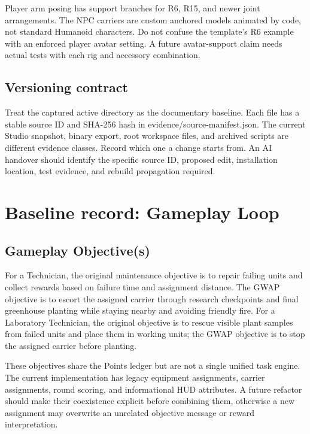 Player arm posing has support branches for R6, R15, and newer joint arrangements.\allowbreak{} The NPC carriers are custom anchored models animated by code, not standard Humanoid characters.\allowbreak{} Do not confuse the template's R6 example with an enforced player avatar setting.\allowbreak{} A future avatar-support claim needs actual tests with each rig and accessory combination.\allowbreak{}

\section{Versioning contract}
Treat the captured active directory as the documentary baseline.\allowbreak{} Each file has a stable source ID and SHA-256 hash in evidence/\allowbreak{}source-manifest.\allowbreak{}json.\allowbreak{} The current Studio snapshot, binary export, root workspace files, and archived scripts are different evidence classes.\allowbreak{} Record which one a change starts from.\allowbreak{} An AI handover should identify the specific source ID, proposed edit, installation location, test evidence, and rebuild propagation required.\allowbreak{}

\chapter{Baseline record: Gameplay Loop}
\section{Gameplay Objective(s)}
For a Technician, the original maintenance objective is to repair failing units and collect rewards based on failure time and assignment distance.\allowbreak{} The GWAP objective is to escort the assigned carrier through research checkpoints and final greenhouse planting while staying nearby and avoiding friendly fire.\allowbreak{} For a Laboratory Technician, the original objective is to rescue visible plant samples from failed units and place them in working units; the GWAP objective is to stop the assigned carrier before planting.\allowbreak{}

These objectives share the Points ledger but are not a single unified task engine.\allowbreak{} The current implementation has legacy equipment assignments, carrier assignments, round scoring, and informational HUD attributes.\allowbreak{} A future refactor should make their coexistence explicit before combining them, otherwise a new assignment may overwrite an unrelated objective message or reward interpretation.\allowbreak{}

